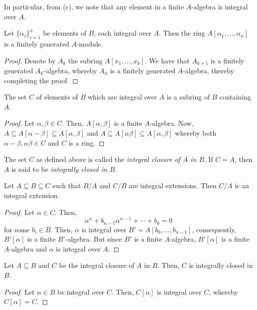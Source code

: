 In particular, from (c), we note that any element in a finite $A$-algebra is integral over $A$.

\begin{proposition}
    Let $\{\alpha_i\}_{i = 1}^n$ be elements of $B$, each integral over $A$. Then the ring $A[\alpha_1,\ldots,\alpha_n]$ is a finitely generated $A$-module.
\end{proposition}
\begin{proof}
    Denote by $A_k$ the subring $A[x_1,\ldots,x_k]$. We have that $A_{k + 1}$ is a finitely generated $A_k$-algebra, whereby $A_n$ is a finitely generated $A$-algebra, thereby completing the proof.
\end{proof}

\begin{corollary}
    The set $C$ of elements of $B$ which are integral over $A$ is a subring of $B$ containing $A$.
\end{corollary}
\begin{proof}
    Let $\alpha,\beta\in C$. Then, $A[\alpha,\beta]$ is a finite $A$-algebra. Now, $A\subseteq A[\alpha - \beta]\subseteq A[\alpha,\beta]$ and $A\subseteq A[\alpha\beta]\subseteq A[\alpha,\beta]$ whereby both $\alpha - \beta,\alpha\beta\in C$ and $C$ is a ring.
\end{proof}

The set $C$ as defined above is called the \textit{integral closure of $A$ in $B$}. If $C = A$, then $A$ is said to be \textit{integrally closed in $B$}.

\begin{theorem}
    Let $A\subseteq B\subseteq C$ such that $B/A$ and $C/B$ are integral extensions. Then $C/A$ is an integral extension.
\end{theorem}
\begin{proof}
    Let $\alpha\in C$. Then, 
    \begin{equation*}
        \alpha^n + b_{n - 1}\alpha^{n - 1} + \cdots + b_0 = 0
    \end{equation*}
    for some $b_i\in B$. Then, $\alpha$ is integral over $B' = A[b_0,\ldots,b_{n - 1}]$, consequently, $B'[\alpha]$ is a finite $B'$-algebra. But since $B'$ is a finite $A$-algebra, $B'[\alpha]$ is a finite $A$-algebra and $\alpha$ is integral over $A$.
\end{proof}

\begin{corollary}
    Let $A\subseteq B$ and $C$ be the integral closure of $A$ in $B$. Then, $C$ is integrally closed in $B$.
\end{corollary}
\begin{proof}
    Let $\alpha\in B$ be integral over $C$. Then, $C[\alpha]$ is integral over $C$, whereby $C[\alpha] = C$.
\end{proof}

